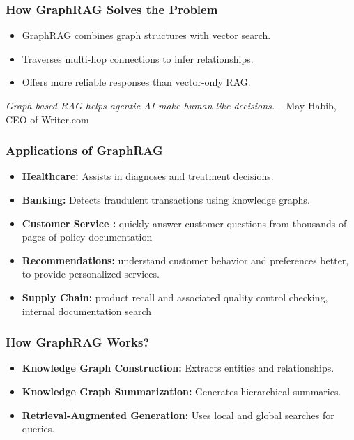 \begin{frame}[fragile]\frametitle{How GraphRAG Solves the Problem}
    \begin{itemize}
        \item GraphRAG combines graph structures with vector search.
        \item Traverses multi-hop connections to infer relationships.
        \item Offers more reliable responses than vector-only RAG.
    \end{itemize}

\textit{Graph-based RAG helps agentic AI make human-like decisions.} 
– May Habib, CEO of Writer.com
\end{frame}




\begin{frame}[fragile]\frametitle{Applications of GraphRAG}
    \begin{itemize}
        \item \textbf{Healthcare:} Assists in diagnoses and treatment decisions.
        \item \textbf{Banking:} Detects fraudulent transactions using knowledge graphs.
        \item \textbf{Customer Service :} quickly answer customer questions from thousands of pages of policy documentation
        \item \textbf{Recommendations:} understand customer behavior and preferences better, to provide personalized services.
        \item \textbf{Supply Chain:} product recall and associated quality control checking, internal documentation search
	
    \end{itemize}

\end{frame}

\begin{frame}[fragile]\frametitle{How GraphRAG Works?}
    \begin{itemize}
        \item \textbf{Knowledge Graph Construction:} Extracts entities and relationships.
        \item \textbf{Knowledge Graph Summarization:} Generates hierarchical summaries.
        \item \textbf{Retrieval-Augmented Generation:} Uses local and global searches for queries.
    \end{itemize}
\end{frame}

